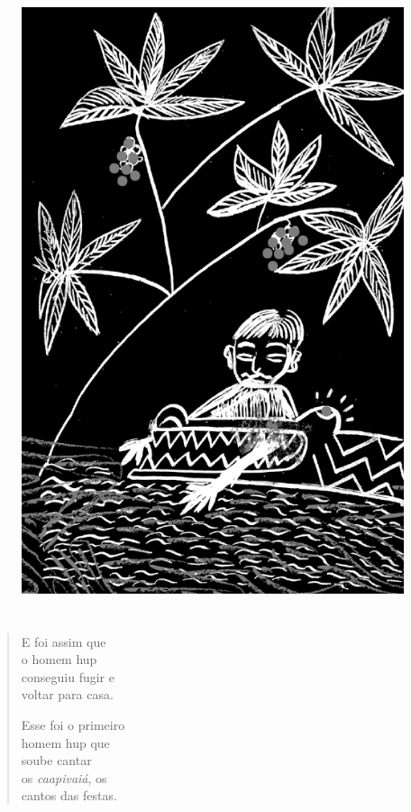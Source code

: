 \begin{figure}
\vspace*{-1.5cm}
\hspace*{-2.4cm}\includegraphics[width=142mm]{./imgs/img7.jpg}
\end{figure}

\chapter*{}

\mbox{}\vspace*{\fill}

\begin{verse}
E foi assim que\\
o homem hup\\
conseguiu fugir e\\
voltar para casa.

Esse foi o primeiro\\
homem hup que\\
soube cantar\\
os \textit{caapivaiá}, os\\
cantos das festas.
\end{verse}

